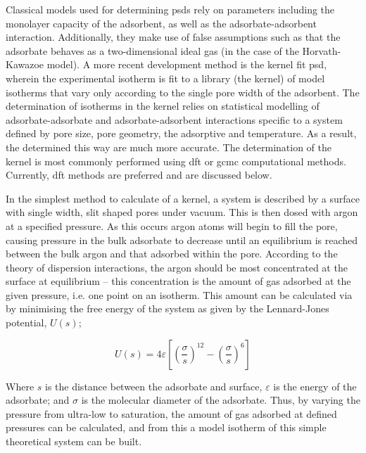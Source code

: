 Classical models used for determining \glspl{psd} rely on parameters including the monolayer capacity of the \gls{adsorbent}, as well as the \gls{adsorbate}-\gls{adsorbent} interaction. Additionally, they make use of false assumptions such as that the \gls{adsorbate} behaves as a two-dimensional ideal gas (in the case of the Horvath-Kawazoe model).\citep{Barrett1951determination, Horvath1983Method}  A more recent development method is the kernel fit \acrshort{psd}, wherein the experimental isotherm is fit to a library (the kernel) of model isotherms that vary only according to the single pore width of the \gls{adsorbent}.\citep{Thommes2015Physisorption, tan1990adsorption, sosin1995using, tarazona1987phase} The determination of isotherms in the kernel relies on statistical modelling of \gls{adsorbate}-\gls{adsorbate} and \gls{adsorbate}-\gls{adsorbent} interactions specific to a system defined by pore size, pore geometry, the adsorptive and temperature. As a result, the  determined this way are much more accurate. The determination of the kernel is most commonly performed using \acrfull{dft} or \acrfull{gcmc} computational methods. Currently, \acrshort{dft} methods are preferred and are discussed below.

In the simplest method to calculate of a kernel, a system is described by a surface with single width, slit shaped pores under vacuum. This is then dosed with argon at a specified pressure. As this occurs argon atoms will begin to fill the pore, causing pressure in the bulk \gls{adsorbate} to decrease until an equilibrium is reached between the bulk argon and that adsorbed within the pore. According to the theory of dispersion interactions, the argon should be most concentrated at the surface at equilibrium – this concentration is the amount of gas adsorbed at the given pressure, i.e. one point on an isotherm. This amount can be calculated via by minimising the free energy of the system as given by the Lennard-Jones potential, $U(s)$;

\begin{equation}
U(s) = 4\varepsilon \left[ \left(\frac{\sigma}{s}\right)^{12} -  \left(\frac{\sigma}{s}\right)^{6} \right]
\end{equation}

Where $s$ is the distance between the \gls{adsorbate} and surface, $\varepsilon$ is the energy of the \gls{adsorbate}; and $\sigma$ is the molecular diameter of the \gls{adsorbate}.  Thus, by varying the pressure from ultra-low to saturation, the amount of gas adsorbed at defined pressures can be calculated, and from this a model isotherm of this simple theoretical system can be built. 

